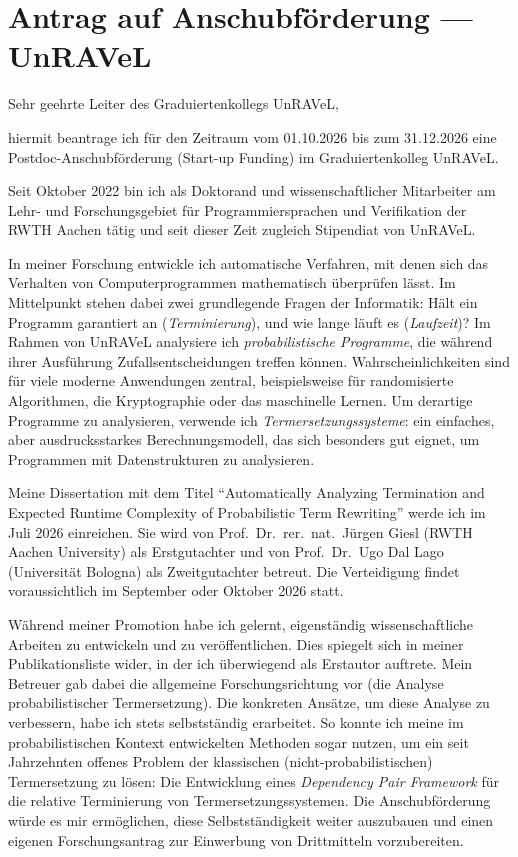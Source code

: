 \section{Antrag auf Anschubförderung --- UnRAVeL}

\noindent Sehr geehrte Leiter des Graduiertenkollegs UnRAVeL,

hiermit beantrage ich für den Zeitraum vom 01.10.2026 bis zum 31.12.2026 eine Postdoc-Anschubförderung (Start-up Funding) im Graduiertenkolleg UnRAVeL.

Seit Oktober 2022 bin ich als Doktorand und wissenschaftlicher Mitarbeiter am Lehr- und Forschungsgebiet für Programmiersprachen und Verifikation der RWTH Aachen tätig und seit dieser Zeit zugleich Stipendiat von UnRAVeL.

In meiner Forschung entwickle ich automatische Verfahren, mit denen sich das Verhalten von Computerprogrammen mathematisch überprüfen lässt.
Im Mittelpunkt stehen dabei zwei grundlegende Fragen der Informatik: Hält ein Programm garantiert an (\emph{Terminierung}), und wie lange läuft es (\emph{Laufzeit})?
Im Rahmen von UnRAVeL analysiere ich \emph{probabilistische Programme}, die während ihrer Ausführung Zufallsentscheidungen treffen können.
Wahrscheinlichkeiten sind für viele moderne Anwendungen zentral, beispielsweise für randomisierte Algorithmen, die Kryptographie oder das maschinelle Lernen.
Um derartige Programme zu analysieren, verwende ich \emph{Termersetzungssysteme}: ein einfaches, aber ausdrucksstarkes Berechnungsmodell, das sich besonders gut eignet, um Programmen mit Datenstrukturen zu analysieren.

Meine Dissertation mit dem Titel ``Automatically Analyzing Termination and Expected Runtime Complexity of Probabilistic Term Rewriting'' werde ich im Juli 2026 einreichen.
Sie wird von Prof.\ Dr.\ rer.\ nat.\ Jürgen Giesl (RWTH Aachen University) als Erstgutachter und von Prof.\ Dr.\ Ugo Dal Lago (Universität Bologna) als Zweitgutachter betreut.
Die Verteidigung findet voraussichtlich im September oder Oktober 2026 statt.

Während meiner Promotion habe ich gelernt, eigenständig wissenschaftliche Arbeiten zu entwickeln und zu veröffentlichen.
Dies spiegelt sich in meiner Publikationsliste wider, in der ich überwiegend als Erstautor auftrete.
Mein Betreuer gab dabei die allgemeine Forschungsrichtung vor (die Analyse probabilistischer Termersetzung). Die konkreten Ansätze, um diese Analyse zu verbessern, habe ich stets selbstständig erarbeitet.
So konnte ich meine im probabilistischen Kontext entwickelten Methoden sogar nutzen, um ein seit Jahrzehnten offenes Problem der klassischen (nicht-probabilistischen) Termersetzung zu lösen: Die Entwicklung eines \emph{Dependency Pair Framework} für die relative Terminierung von Termersetzungssystemen.
Die Anschubförderung würde es mir ermöglichen, diese Selbstständigkeit weiter auszubauen und einen eigenen Forschungsantrag zur Einwerbung von Drittmitteln vorzubereiten.

